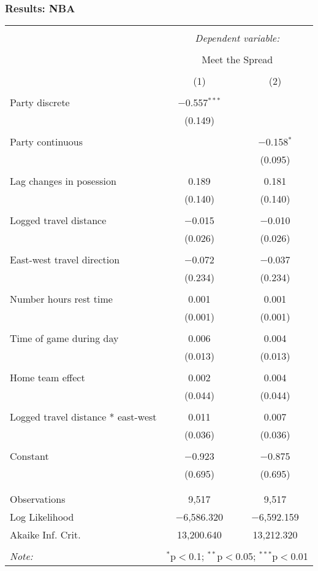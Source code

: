 \documentclass{beamer}
\begin{document}
\begin{frame}   \frametitle{Results: NBA}
  \vspace{-2pt}
  \centering
  \tiny{ %
\begin{tabular}{@{\extracolsep{5pt}}lcc}  \\[-1.8ex]\hline  \hline \\[-1.8ex]   & \multicolumn{2}{c}{\textit{Dependent variable:}} \\  \cline{2-3}  \\[-1.8ex] & \multicolumn{2}{c}{Meet the Spread} \\  \\[-1.8ex] & (1) & (2)\\  \hline \\[-1.8ex]   Party discrete & $-$0.557$^{***}$ &  \\    & (0.149) &  \\    & & \\   Party continuous &  & $-$0.158$^{*}$ \\    &  & (0.095) \\    & & \\   Lag changes in posession & 0.189 & 0.181 \\    & (0.140) & (0.140) \\    & & \\   Logged travel distance & $-$0.015 & $-$0.010 \\    & (0.026) & (0.026) \\    & & \\   East-west travel direction & $-$0.072 & $-$0.037 \\    & (0.234) & (0.234) \\    & & \\   Number hours rest time & 0.001 & 0.001 \\    & (0.001) & (0.001) \\    & & \\   Time of game during day & 0.006 & 0.004 \\    & (0.013) & (0.013) \\    & & \\   Home team effect & 0.002 & 0.004 \\    & (0.044) & (0.044) \\    & & \\   Logged travel distance * east-west & 0.011 & 0.007 \\    & (0.036) & (0.036) \\    & & \\   Constant & $-$0.923 & $-$0.875 \\    & (0.695) & (0.695) \\    & & \\  \hline \\[-1.8ex]  Observations & 9,517 & 9,517 \\  Log Likelihood & $-$6,586.320 & $-$6,592.159 \\  Akaike Inf. Crit. & 13,200.640 & 13,212.320 \\  \hline  \hline \\[-1.8ex]  \textit{Note:}  & \multicolumn{2}{r}{$^{*}$p$<$0.1; $^{**}$p$<$0.05; $^{***}$p$<$0.01} \\  \end{tabular} 
}
\end{frame}
\end{document}
